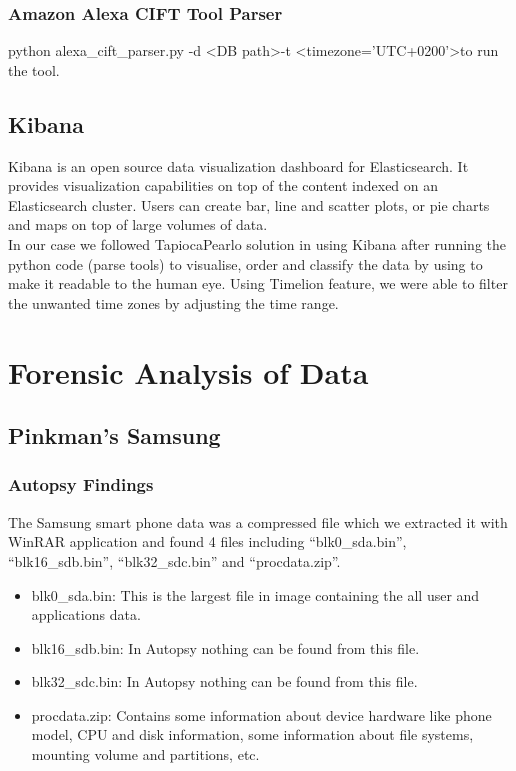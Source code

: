 \documentclass{easychair}
\begin{document}
\subsubsection{Amazon Alexa CIFT Tool Parser}
python alexa\_cift\_parser.py -d \textless DB path\textgreater -t \textless timezone=’UTC+0200’\textgreater to run the tool.

\subsection{Kibana}
Kibana is an open source data visualization dashboard for Elasticsearch. It provides visualization capabilities on top of the content indexed on an Elasticsearch cluster. Users can create bar, line and scatter plots, or pie charts and maps on top of large volumes of data. \cite{Ali_4} \cite{Ali_5} \\ In our case we followed TapiocaPearlo solution in using Kibana after running the python code (parse tools) to visualise, order and classify the data by using to make it readable to the human eye. Using Timelion feature, we were able to filter the unwanted time zones by adjusting the time range. 





\section{Forensic Analysis of Data}


\subsection{Pinkman's Samsung}
 \subsubsection{Autopsy Findings}
 The Samsung smart phone data was a compressed file which we extracted it with WinRAR application and found 4 files including “blk0\_{sda.bin}”, “blk16\_sdb.bin”, “blk32\_sdc.bin” and “procdata.zip”. 

\begin{itemize}
\item blk0\_sda.bin: This is the largest file in image containing the all user and applications data.
\item blk16\_sdb.bin: In Autopsy nothing can be found from this file.
\item blk32\_sdc.bin: In Autopsy nothing can be found from this file.
\item procdata.zip: Contains some information about device hardware like phone model, CPU and disk information, some information about file systems, mounting volume and partitions, etc. 
 \end{itemize}
 
\end{document}
